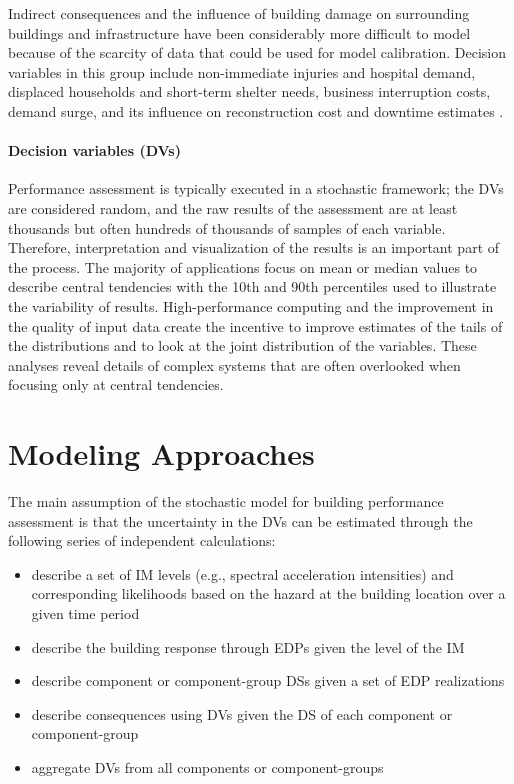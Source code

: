 Indirect consequences and the influence of building damage on surrounding buildings and infrastructure have been considerably more difficult to model because of the scarcity of data that could be used for model calibration. Decision variables in this group include non-immediate injuries and hospital demand, displaced households and short-term shelter needs, business interruption costs, demand surge, and its influence on reconstruction cost and downtime estimates \citep{arup2013resiliencebased}.

\paragraph{Decision variables (DVs)} Performance assessment is typically executed in a stochastic framework; the DVs are considered random, and the raw results of the assessment are at least thousands but often hundreds of thousands of samples of each variable. Therefore, interpretation and visualization of the results is an important part of the process. The majority of applications focus on mean or median values to describe central tendencies with the 10th and 90th percentiles used to illustrate the variability of results. High-performance computing and the improvement in the quality of input data create the incentive to improve estimates of the tails of the distributions and to look at the joint distribution of the variables. These analyses reveal details of complex systems that are often overlooked when focusing only at central tendencies.

\section{Modeling Approaches}
\label{sec:perf_bldg_methods}

The main assumption of the stochastic model for building performance assessment is that the uncertainty in the DVs can be estimated through the following series of independent calculations: 

\begin{itemize}
    \item describe a set of IM levels (e.g., spectral acceleration intensities) and corresponding likelihoods based on the hazard at the building location over a given time period
    \item describe the building response through EDPs given the level of the IM
    \item describe component or component-group DSs given a set of EDP realizations
    \item describe consequences using DVs given the DS of each component or component-group
    \item aggregate DVs from all components or component-groups
\end{itemize}

